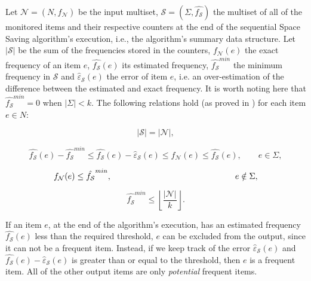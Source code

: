 \documentclass[final,3p,times]{elsarticle}
\begin{document}
Let $\mathcal{N} = (N, f_{\mathcal{N}})$ be the input multiset, $\mathcal{S} = (\Sigma, \hat{f_{\mathcal{S}}})$ the multiset of all of the monitored items and their respective counters at the end of the sequential Space Saving algorithm's execution, i.e., the algorithm's summary data structure. Let  $\left\vert \mathcal{S} \right\vert$ be the sum of the frequencies stored in the counters, $f_\mathcal{N}(e)$ the exact frequency of an item $e$, $\hat{f_\mathcal{S}}(e)$ its estimated frequency, $\hat{f_\mathcal{S}}^{min}$ the minimum frequency in $\mathcal{S}$ and $\hat{\varepsilon}_\mathcal{S}(e)$ the error of item $e$, i.e. an over-estimation of the difference between the estimated and exact frequency. It is worth noting here that $\hat{f_\mathcal{S}}^{min} = 0$ when  $\left\vert{\Sigma}\right\vert < k$. 
The following relations hold (as proved in \cite{Metwally2006}) for each item $e \in N$:

\begin{equation}
\label{eq04}
\left\vert{\mathcal{S}}\right\vert = \left\vert{\mathcal{N}}\right\vert,
\end{equation}

\begin{equation}
\label{eq05}
\hat{f_\mathcal{S}}(e) - \hat{f_\mathcal{S}}^{min} \leq\hat{f_\mathcal{S}}(e) - \hat{\varepsilon}_\mathcal{S}(e) \leq f_\mathcal{N}(e) \leq \hat{f_\mathcal{S}}(e),  \qquad e \in \Sigma,
\end{equation}

\begin{equation}
\label{eq06}
f_\mathcal{N}(e)  \leq \hat{f_\mathcal{S}}^{min}, \qquad \hspace{45mm} e \notin \Sigma,
\end{equation}

\begin{equation}
\label{eq07}
\hat{f_\mathcal{S}}^{min}  \leq \left\lfloor\frac{\left\vert{\mathcal{N}}\right\vert}{k}\right\rfloor.
\end{equation}

If an item $e$, at the end of the algorithm's execution, has an estimated frequency $\hat{f_\mathcal{S}}(e)$ less than the required threshold, $e$ can be excluded from the output, since it can not be a frequent item. Instead, if we keep track of the error $\hat{\varepsilon}_\mathcal{S}(e)$ and $\hat{f_\mathcal{S}}(e) - \hat{\varepsilon}_\mathcal{S}(e)$ is greater than or equal to the threshold, then $e$ is a frequent item. All of the other output items are only \emph{potential} frequent items.
\end{document}
